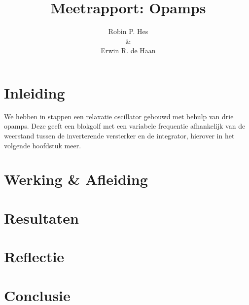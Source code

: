 \documentclass{report}
\title{Meetrapport: Opamps}
\author{Robin P. Hes\\\&\\Erwin R. de Haan}
\begin{document}
\maketitle
\tableofcontents
\chapter{Inleiding}
We hebben in stappen een relaxatie oscillator gebouwd met behulp van drie opamps. Deze geeft een blokgolf met een variabele frequentie afhankelijk van de weerstand tussen de inverterende versterker en de integrator, hierover in het volgende hoofdstuk meer.
\chapter{Werking \& Afleiding}
\chapter{Resultaten}
\chapter{Reflectie}
\chapter{Conclusie}
\printbibliography
\end{document}
